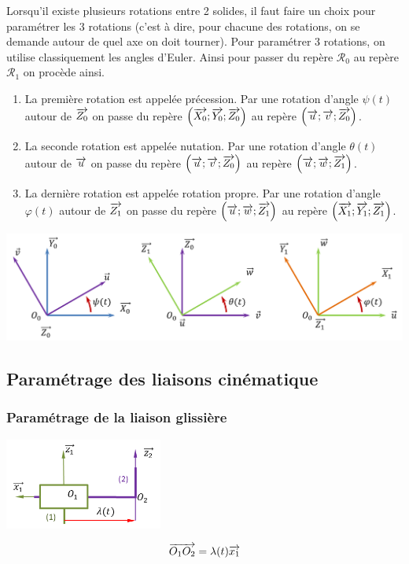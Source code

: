 \documentclass[10pt,oneside]{article}
\begin{document}
\begin{methode}
Lorsqu'il existe plusieurs rotations entre 2 solides, il faut faire un choix pour paramétrer les 3 rotations (c'est à dire, pour chacune des rotations, on se demande autour de quel axe on doit tourner). Pour paramétrer 3 rotations, on utilise classiquement les angles d'Euler. Ainsi pour passer du repère $\mathcal{R}_0$ au repère $\mathcal{R}_1$ on procède ainsi.

\begin{enumerate}
\item La première rotation est appelée précession. Par une rotation d'angle $\psi(t)$ autour de $\overrightarrow{Z_0}$ on passe du repère $\left( \overrightarrow{X_0};\overrightarrow{Y_0};\overrightarrow{Z_0}\right)$ au repère $\left( \overrightarrow{u};\overrightarrow{v};\overrightarrow{Z_0}\right)$.
\item La seconde rotation est appelée nutation. Par une rotation d'angle $\theta(t)$ autour de $\overrightarrow{u}$ on passe du repère $\left( \overrightarrow{u};\overrightarrow{v};\overrightarrow{Z_0}\right)$ au repère $\left( \overrightarrow{u};\overrightarrow{w};\overrightarrow{Z_1}\right)$.
\item La dernière rotation est appelée rotation propre. Par une rotation d'angle $\varphi(t)$ autour de $\overrightarrow{Z_1}$ on passe du repère $\left( \overrightarrow{u};\overrightarrow{w};\overrightarrow{Z_1}\right)$ au repère $\left( \overrightarrow{X_1};\overrightarrow{Y_1};\overrightarrow{Z_1}\right)$.
\end{enumerate}

\begin{center}
\includegraphics[width=.9\textwidth]{png/param_euler}
\end{center}
\end{methode}

\subsection{Paramétrage des liaisons cinématique}

\subsubsection{Paramétrage de la liaison glissière}
\begin{minipage}[c]{.3\linewidth}
\begin{center}
\includegraphics[height=3cm]{png/glissiere_p}
\end{center}
\end{minipage} \hfill
\begin{minipage}[c]{.65\linewidth}
$$
\overrightarrow{O_1 O_2} = \lambda(t) \overrightarrow{x_1}
$$
\end{minipage}
\end{document}
